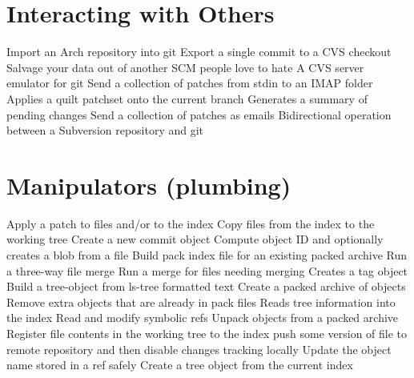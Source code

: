 \section{Interacting with Others}{}
	{Import an Arch repository into git}
	{Export a single commit to a CVS checkout}
	{Salvage your data out of another SCM people love to hate}
	{A CVS server emulator for git}
	{Send a collection of patches from stdin to an IMAP folder}
	{Applies a quilt patchset onto the current branch}
	{Generates a summary of pending chan\-ges}
	{Send a collection of patches as emails}
	{Bidirectional operation between a Subversion repository and git}

\section{Manipulators (plumbing)}{}
	{Apply a patch to files and/or to the index}
	{Copy files from the index to the working tree}
	{Create a new commit object}
	{Compute object ID and optionally creates a blob from a file}
	{Build pack index file for an existing packed archive}
	{Run a three-way file merge}
	{Run a merge for files needing merging}
	{Creates a tag object}
	{Build a tree-object from ls-tree formatted text}
	{Create a packed archive of objects}
	{Remove extra objects that are already in pack files}
	{Reads tree information into the index}
	{Read and modify symbolic refs}
	{Unpack objects from a packed archive}
	{Register file contents in the working tree to the index}
	{push some version of file to remote repository and then disable changes tracking locally}
	{Update the object name stored in a ref safely}
	{Create a tree object from the current index}

